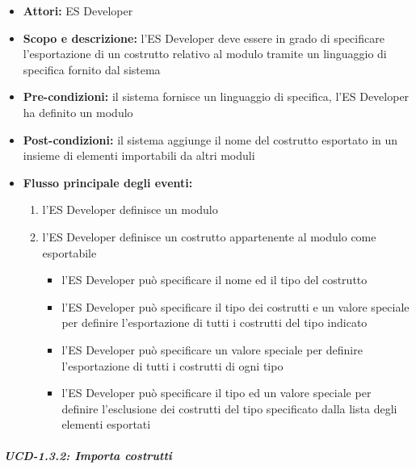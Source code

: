 \begin{itemize}
	\item \textbf{Attori:} ES Developer
	\item \textbf{Scopo e descrizione:} l'ES Developer deve essere in grado di specificare l'esportazione di un costrutto relativo al modulo tramite un linguaggio di specifica fornito dal sistema
	\item \textbf{Pre-condizioni:} il sistema fornisce un linguaggio di specifica, l'ES Developer ha definito un modulo
	\item \textbf{Post-condizioni:} il sistema aggiunge il nome del costrutto esportato in un insieme di elementi importabili da altri moduli
	\item \textbf{Flusso principale degli eventi:}
		\begin{enumerate}
			\item l'ES Developer definisce un modulo
			\item l'ES Developer definisce un costrutto appartenente al modulo come esportabile
				\begin{itemize}
					\item l'ES Developer può specificare il nome ed il tipo del costrutto
					\item l'ES Developer può specificare il tipo dei costrutti e un valore speciale per definire l'esportazione di tutti i costrutti del tipo indicato
					\item l'ES Developer può specificare un valore speciale per definire l'esportazione di tutti i costrutti di ogni tipo
					\item l'ES Developer può specificare il tipo ed un valore speciale per definire l'esclusione dei costrutti del tipo specificato dalla lista degli elementi esportati
				\end{itemize}
		\end{enumerate}
\end{itemize}


\subparagraph{UCD-1.3.2: Importa costrutti}

